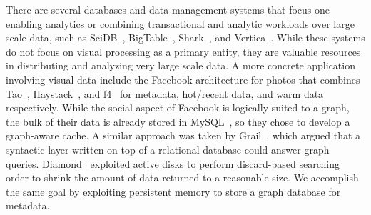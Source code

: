 There are several databases and data management systems that focus one enabling
analytics or combining transactional and analytic workloads over large
scale data, such as SciDB~\cite{brown2010overview},
BigTable~\cite{chang2008bigtable}, Shark~\cite{xin2013shark},
and Vertica~\cite{lamb2012vertica}.
While these systems do not focus on visual processing as a primary entity,
they are valuable resources in distributing and analyzing very large scale data.
A more concrete application involving visual data include
the Facebook architecture for photos that combines Tao~\cite{tao},
Haystack~\cite{beaver2010finding}, and f4~\cite{muralidhar2014f4} for metadata,
hot/recent data, and warm data respectively.
While the social aspect of Facebook is logically suited to a graph,
the bulk of their data is already stored in MySQL~\cite{mysql},
so they chose to develop a graph-aware cache.
A similar approach was taken by Grail~\cite{fan2015case},
which argued that a syntactic layer written on top of a relational database
could answer graph queries.
Diamond~\cite{huston2004diamond,satyanarayanan2010unique} exploited active
disks to perform discard-based searching order to shrink the amount of data
returned to a reasonable size.
We accomplish the same goal by exploiting persistent memory to store a
graph database for metadata.
